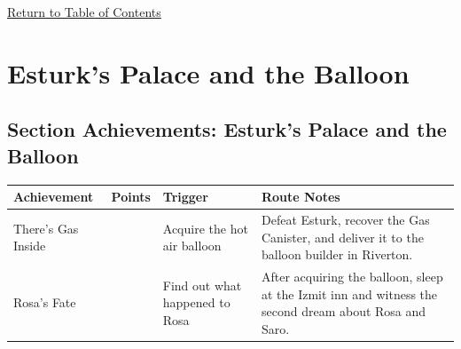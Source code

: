 \documentclass[
  american,
  10pt,
  letterpaper,
  oneside,
  open=any]{scrreprt}
\newcounter{none} %
\newenvironment{guidetable}{%
  \small\setstretch{1.0}%
  \setlength{\tabcolsep}{4pt}%
  \setlength{\LTpre}{8pt}\setlength{\LTpost}{10pt}%
  \renewcommand{\arraystretch}{1.16}%
}{ }
\begin{document}
\hyperref[table-of-contents]{Return to Table of Contents}

\chapter{Esturk's Palace and the
Balloon}\label{esturks-palace-and-the-balloon}

\section{Section Achievements: Esturk's Palace and the
Balloon}\label{section-achievements-esturks-palace-and-the-balloon}

\begin{guidetable}

{\def\LTcaptype{none} %
\begin{longtable}[]{@{}
  >{\raggedright\arraybackslash}p{}
  >{\raggedleft\arraybackslash}p{}
  >{\raggedright\arraybackslash}p{}
  >{\raggedright\arraybackslash}p{}@{}}
\toprule\noalign{}
\begin{minipage}[b]{\linewidth}\raggedright
\color{GuideGreen}\bfseries Achievement
\end{minipage} & \begin{minipage}[b]{\linewidth}\raggedleft
\color{GuideGreen}\bfseries Points
\end{minipage} & \begin{minipage}[b]{\linewidth}\raggedright
\color{GuideGreen}\bfseries Trigger
\end{minipage} & \begin{minipage}[b]{\linewidth}\raggedright
\color{GuideGreen}\bfseries Route Notes
\end{minipage} \\
\midrule\noalign{}
\endhead
\bottomrule\noalign{}
\endlastfoot
There's Gas Inside & 10 & Acquire the hot air balloon & Defeat Esturk,
recover the Gas Canister, and deliver it to the balloon builder in
Riverton. \\
Rosa's Fate & 5 & Find out what happened to Rosa & After acquiring the
balloon, sleep at the Izmit inn and witness the second dream about Rosa
and Saro. \\
\end{longtable}
}

\end{guidetable}
\end{document}
